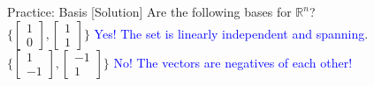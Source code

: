 \begin{frame}{Practice: Basis [Solution]}
    Are the following bases for $\mathbb{R}^n$? \\[3ex]

    $\bigg\{ \begin{bmatrix}
        1 \\ 0
    \end{bmatrix}, 
    \begin{bmatrix}
        1 \\ 1
    \end{bmatrix} \bigg\}$ \textcolor{blue}{Yes! The set is linearly independent and spanning}. \\[2ex]
    $\bigg\{ \begin{bmatrix}
        1 \\ -1
    \end{bmatrix}, 
    \begin{bmatrix}
        -1 \\ 1
    \end{bmatrix} \bigg\}$ \textcolor{blue}{No! The vectors are negatives of each other!}
\end{frame}